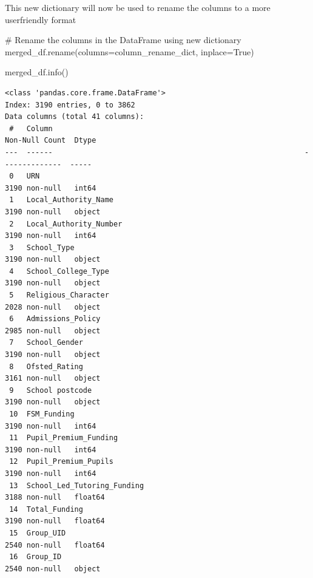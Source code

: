 \documentclass[
  letterpaper,
  DIV=11,
  numbers=noendperiod]{scrartcl}
\newenvironment{Shaded}{\begin{snugshade}}{\end{snugshade}}
\newcommand{\CommentTok}[1]{\textcolor[rgb]{0.37,0.37,0.37}{#1}}
\newcommand{\NormalTok}[1]{\textcolor[rgb]{0.00,0.23,0.31}{#1}}
\newcommand{\OperatorTok}[1]{\textcolor[rgb]{0.37,0.37,0.37}{#1}}
\newcommand{\VariableTok}[1]{\textcolor[rgb]{0.07,0.07,0.07}{#1}}
\begin{document}
This new dictionary will now be used to rename the columns to a more
userfriendly format

\begin{Shaded}
\begin{Highlighting}[]
\CommentTok{\# Rename the columns in the DataFrame using new dictionary}
\NormalTok{merged\_df.rename(columns}\OperatorTok{=}\NormalTok{column\_rename\_dict, inplace}\OperatorTok{=}\VariableTok{True}\NormalTok{)}

\NormalTok{merged\_df.info()}
\end{Highlighting}
\end{Shaded}

\begin{verbatim}
<class 'pandas.core.frame.DataFrame'>
Index: 3190 entries, 0 to 3862
Data columns (total 41 columns):
 #   Column                                                          Non-Null Count  Dtype  
---  ------                                                          --------------  -----  
 0   URN                                                             3190 non-null   int64  
 1   Local_Authority_Name                                            3190 non-null   object 
 2   Local_Authority_Number                                          3190 non-null   int64  
 3   School_Type                                                     3190 non-null   object 
 4   School_College_Type                                             3190 non-null   object 
 5   Religious_Character                                             2028 non-null   object 
 6   Admissions_Policy                                               2985 non-null   object 
 7   School_Gender                                                   3190 non-null   object 
 8   Ofsted_Rating                                                   3161 non-null   object 
 9   School postcode                                                 3190 non-null   object 
 10  FSM_Funding                                                     3190 non-null   int64  
 11  Pupil_Premium_Funding                                           3190 non-null   int64  
 12  Pupil_Premium_Pupils                                            3190 non-null   int64  
 13  School_Led_Tutoring_Funding                                     3188 non-null   float64
 14  Total_Funding                                                   3190 non-null   float64
 15  Group_UID                                                       2540 non-null   float64
 16  Group_ID                                                        2540 non-null   object 

\end{verbatim}
\end{document}
